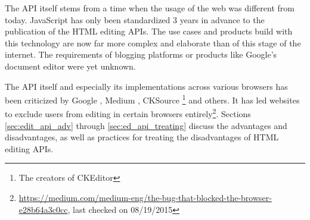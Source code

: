 The API itself stems from a time when the usage of the web was different from today. JavaScript has only been standardized 3 years in advance to the publication of the HTML editing APIs. The use cases and products build with this technology are now far more complex and elaborate than of this stage of the internet. The requirements of blogging platforms or products like Google's document editor were yet unknown. %

The API itself and especially its implementations across various browsers has been criticized by Google \cite{bw}, Medium \cite{medium_ce_terrible}, CKSource \cite{bj}\footnote{The creators of CKEditor} and others. It has led websites to exclude users from editing in certain browsers entirely\footnote{\url{https://medium.com/medium-eng/the-bug-that-blocked-the-browser-e28b64a3c0cc}, last checked on 08/19/2015}. Sections \ref{sec:edit_api_adv} through \ref{sec:ed_api_treating} discuss the advantages and disadvantages, as well as practices for treating the disadvantages of HTML editing APIs.











